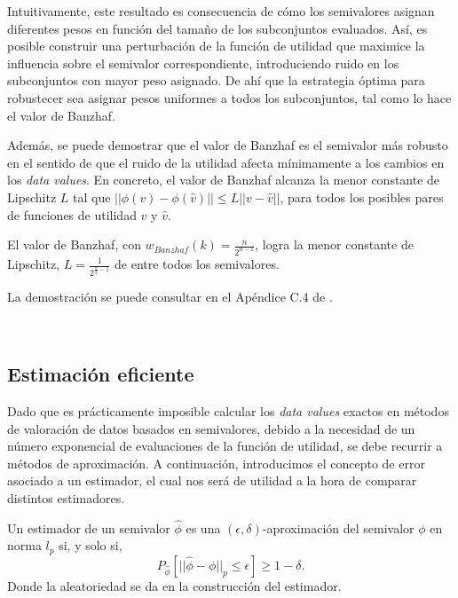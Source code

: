 Intuitivamente, este resultado es consecuencia de cómo los
semivalores asignan diferentes pesos en función del
tamaño de los subconjuntos evaluados. Así, es posible
construir una perturbación de la función de utilidad
que maximice la influencia sobre el semivalor
correspondiente, introduciendo ruido en los subconjuntos
con mayor peso asignado. De ahí que la estrategia
óptima para robustecer sea asignar pesos uniformes a
todos los subconjuntos, tal como lo hace el valor de Banzhaf.

Además, se puede demostrar que el valor de Banzhaf es
el semivalor más robusto en el sentido de que el ruido
de la utilidad afecta mínimamente a los cambios en los
\textit{data values}. En concreto, el valor de
Banzhaf alcanza la menor constante de Lipschitz $L$
tal que $||\phi(v)-\phi(\hat{v})|| \leq L||v-\hat{v}||$,
para todos los posibles pares de funciones de utilidad
$v$ y $\hat{v}$.

\begin{theorem}
  El valor de Banzhaf, con $w_{Banzhaf}(k) = \frac{n}{2^{n-1}}$,
  logra la menor constante de Lipschitz,
  $L = \frac{1}{2^{\frac{n}{2}-1}}$ de entre todos los semivalores.
\end{theorem}

La demostración se puede consultar en el Apéndice
C.4 de \cite{dataBanzhaf}.

\

\subsection{Estimación eficiente}

Dado que es prácticamente imposible calcular los
\textit{data values} exactos en métodos de valoración
de datos basados en semivalores, debido a la necesidad
de un número exponencial de evaluaciones de la función
de utilidad, se debe recurrir a métodos de aproximación.
A continuación, introducimos el concepto de error
asociado a un estimador, el cual nos será de utilidad
a la hora de comparar distintos estimadores.

\begin{definition}
  Un estimador de un semivalor $\hat{\phi}$ es \index{$\hat{\phi}$}
  una $(\epsilon,\delta)$-aproximación del semivalor $\phi$ 
  en norma $l_p$ si, y solo si,
  \[
  P_{\hat{\phi}}[||\hat{\phi}-\phi||_p\leq \epsilon] \geq 1-\delta.
  \]
  Donde la aleatoriedad se da en la construcción del estimador.
\end{definition}

